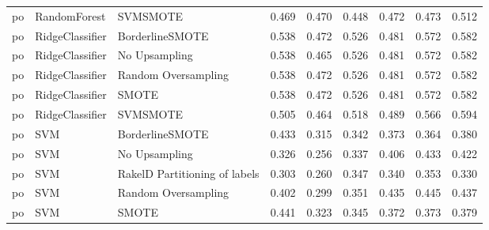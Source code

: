 \begin{tabular}{lllllllll}
      po &                    RandomForest &                      SVMSMOTE & 0.469 &                     0.470 &                 0.448 &                  0.472 &                                   0.473 &     0.512 \\
      po &                 RidgeClassifier &               BorderlineSMOTE & 0.538 &                     0.472 &                 0.526 &                  0.481 &                                   0.572 &     0.582 \\
      po &                 RidgeClassifier &                 No Upsampling & 0.538 &                     0.465 &                 0.526 &                  0.481 &                                   0.572 &     0.582 \\
      po &                 RidgeClassifier &           Random Oversampling & 0.538 &                     0.472 &                 0.526 &                  0.481 &                                   0.572 &     0.582 \\
      po &                 RidgeClassifier &                         SMOTE & 0.538 &                     0.472 &                 0.526 &                  0.481 &                                   0.572 &     0.582 \\
      po &                 RidgeClassifier &                      SVMSMOTE & 0.505 &                     0.464 &                 0.518 &                  0.489 &                                   0.566 &     0.594 \\
      po &                             SVM &               BorderlineSMOTE & 0.433 &                     0.315 &                 0.342 &                  0.373 &                                   0.364 &     0.380 \\
      po &                             SVM &                 No Upsampling & 0.326 &                     0.256 &                 0.337 &                  0.406 &                                   0.433 &     0.422 \\
      po &                             SVM & RakelD Partitioning of labels & 0.303 &                     0.260 &                 0.347 &                  0.340 &                                   0.353 &     0.330 \\
      po &                             SVM &           Random Oversampling & 0.402 &                     0.299 &                 0.351 &                  0.435 &                                   0.445 &     0.437 \\
      po &                             SVM &                         SMOTE & 0.441 &                     0.323 &                 0.345 &                  0.372 &                                   0.373 &     0.379 \\

\end{tabular}
